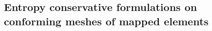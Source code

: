\documentclass{svjour3}                     %
\renewcommand{\hat}{\widehat}
\newcommand{\LRp}[1]{\left( #1 \right)}
\begin{document}

\subsection{Entropy conservative formulations on conforming meshes of mapped elements}
\label{sec:mapped}
\end{document}
